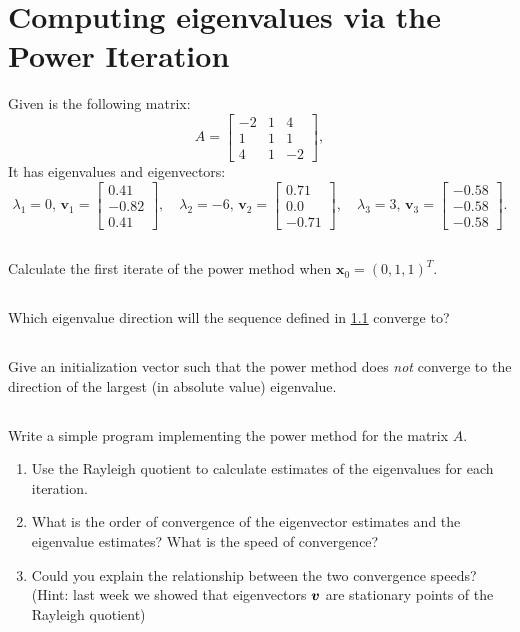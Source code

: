 \documentclass[11pt,letterpaper]{article}
\begin{document}
 

\section{Computing eigenvalues via the Power Iteration}
Given is the following matrix:
\[
A=\begin{bmatrix}
-2 & 1 & 4  \\ 1 & 1 & 1 \\ 4 & 1 & -2 \end{bmatrix},
\]
It has eigenvalues and eigenvectors:
\[
\lambda_1=0,
\, {\boldsymbol v_1}
=\begin{bmatrix}
0.41  \\ -0.82 \\ 0.41 \end{bmatrix},\quad
\lambda_2=-6,
\,{\boldsymbol v_2}
=\begin{bmatrix}
0.71  \\ 0.0 \\ -0.71 \end{bmatrix},\quad
\lambda_3=3, \,{\boldsymbol v_3}
=\begin{bmatrix}
-0.58  \\ -0.58 \\ -0.58 \end{bmatrix}.
\]

\subsection{}\label{sec:1.a}
Calculate the first iterate of the power method when ${\boldsymbol x_0}=(0,1,1)^T$.

\subsection{}
Which eigenvalue direction will the sequence defined in \ref{sec:1.a} converge to?
  
\subsection{}
Give an initialization vector such that the power method does \emph{not} converge to the direction of the largest (in absolute value) eigenvalue.
  
\subsection{}\label{sec:1d}
Write a simple program implementing the power method for the matrix $A$.
\begin{enumerate}
    \item Use the Rayleigh quotient to calculate estimates of the eigenvalues for each iteration.
    \item What is the order of convergence of the eigenvector estimates and the eigenvalue estimates? What is the speed of convergence?
    \item Could you explain the relationship between the two convergence speeds? \\
    (Hint: last week we showed that eigenvectors $\boldsymbol{v}$ are stationary points of the Rayleigh quotient)
\end{enumerate}
\end{document}
